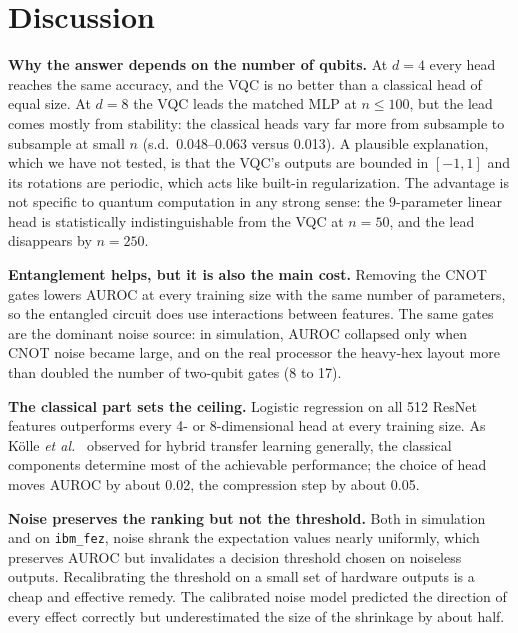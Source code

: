 \documentclass[conference]{IEEEtran}
\begin{document}
\section{Discussion}
\label{sec:discussion}
\textbf{Why the answer depends on the number of qubits.} At $d=4$ every
head reaches the same accuracy, and the VQC is no better than a classical
head of equal size. At $d=8$ the VQC leads the matched MLP at $n\le100$,
but the lead comes mostly from stability: the classical heads vary far
more from subsample to subsample at small $n$ (s.d.\ 0.048--0.063 versus
0.013). A plausible explanation, which we have not tested, is that the
VQC's outputs are bounded in $[-1,1]$ and its rotations are periodic,
which acts like built-in regularization. The advantage is not specific
to quantum computation in any strong sense: the 9-parameter linear head is
statistically indistinguishable from the VQC at $n=50$, and the lead
disappears by $n=250$.

\textbf{Entanglement helps, but it is also the main cost.} Removing the
CNOT gates lowers AUROC at every training size with the same number of
parameters, so the entangled circuit does use interactions between
features. The same gates are the dominant noise source: in simulation,
AUROC collapsed only when CNOT noise became large, and on the real
processor the heavy-hex layout more than doubled the number of
two-qubit gates (8 to 17).

\textbf{The classical part sets the ceiling.} Logistic regression on all
512 ResNet features outperforms every 4- or 8-dimensional head at every
training size. As Kölle \emph{et al.}~\cite{kolle2024} observed for hybrid
transfer learning generally, the classical components determine most of
the achievable performance; the choice of head moves AUROC by about 0.02,
the compression step by about 0.05.

\textbf{Noise preserves the ranking but not the threshold.} Both in
simulation and on \texttt{ibm\_fez}, noise shrank the expectation values
nearly uniformly, which preserves AUROC but invalidates a decision
threshold chosen on noiseless outputs. Recalibrating the threshold on a
small set of hardware outputs is a cheap and effective remedy. The
calibrated noise model predicted the direction of every effect correctly
but underestimated the size of the shrinkage by about half.
\end{document}
